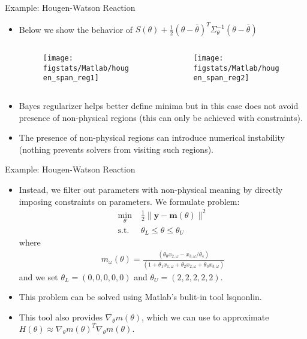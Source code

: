 \documentclass[9pt]{beamer}
\begin{document}
%
\begin{frame}{Example: Hougen-Watson Reaction}

\begin{itemize}
\item Below we show the behavior of $S(\theta)+\frac{1}{2}(\theta-\bar{\theta})^T\Sigma_\theta^{-1} (\theta -\bar{\theta})$ 
\begin{columns}
\begin{column}{0.5\textwidth}
\begin{figure}[!htb]
    \centering
	\texttt{[image: figstats/Matlab/hougen\_span\_reg1]}
\end{figure}
\end{column}
\begin{column}{0.5\textwidth}
\begin{figure}[!htb]
    \centering
	\texttt{[image: figstats/Matlab/hougen\_span\_reg2]}
\end{figure}
\end{column}
\end{columns}
\item Bayes regularizer helps better define minima but in this case does not avoid presence of non-physical regions (this can only be achieved with constraints). 
\item The presence of non-physical regions can introduce numerical instability (nothing prevents solvers from visiting such regions). 
\end{itemize}
\end{frame}

%
\begin{frame}{Example: Hougen-Watson Reaction}

\begin{itemize}
\item Instead, we filter out parameters with non-physical meaning by directly imposing constraints on parameters. We formulate problem:
\begin{align*}
\min_{\theta}& \; \frac{1}{2}\|\mathbf{y}- \mathbf{m}(\theta)\|^2\\ 
\textrm{s.t.}&\; \theta_L\leq \theta\leq\theta_U 
\end{align*}
where
\begin{align*}
m_\omega(\theta)=\frac{(\theta_0x_{2,\omega}-x_{3,\omega}/\theta_4)}{(1+\theta_1x_{1,\omega}+\theta_2x_{2,\omega}+\theta_3x_{3,\omega})}
\end{align*}
and we set $\theta_L=(0,0,0,0,0)$ and $\theta_U=(2,2,2,2,2)$. 
\item This problem can be solved using Matlab's bulit-in tool \textrm{lsqnonlin}. 
\item This tool also provides $\nabla_\theta m(\theta)$, which we can use to approximate $H(\theta)\approx \nabla_\theta m(\theta)^T\nabla_\theta m(\theta)$.
\end{itemize}
\end{frame}
\end{document}
